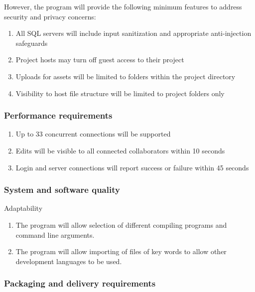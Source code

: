 \documentclass[twoside,letterpaper]{article}
\begin{document}
		However, the program will provide the following minimum features to address security and privacy concerns:
		\begin{enumerate}
		  \item All SQL servers will include input sanitization and appropriate anti-injection safeguards
		  \item Project hosts may turn off guest access to their project
		  \item Uploads for assets will be limited to folders within the project directory
		  \item Visibility to host file structure will be limited to project folders only
		\end{enumerate}
		
	\subsubsection[Performance requirements]{\rmfamily\bfseries Performance
		requirements}
		\hypertarget{RefHeading18859017292}{}
		
		\begin{enumerate}
		  \item Up to 33 concurrent connections will be supported
		  \item Edits will be visible to all connected collaborators within 10 seconds
		  \item Login and server connections will report success or failure within 45 seconds
		\end{enumerate}
		
	\subsubsection[System and software quality]{\rmfamily\bfseries System and software
		quality}
		\hypertarget{RefHeading19059017292}{}
		
		Adaptability
		\begin{enumerate}
		  \item The program will allow selection of different compiling programs and command line arguments.
		  \item The program will allow importing of files of key words to allow other development languages to be used.
		\end{enumerate}
		
	\subsubsection[Packaging and delivery requirements]{\rmfamily\bfseries
		Packaging and delivery requirements}
		\hypertarget{RefHeading19259017292}{}
		
\end{document}
